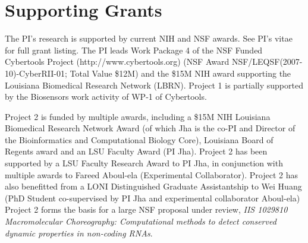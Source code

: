 \documentclass[a4paper,10pt]{article}
\begin{document}


\section*{Supporting Grants}

The PI's research is supported by current NIH and NSF awards.  See PI's vitae for full grant listing.
The PI leads Work Package 4 of the NSF Funded Cybertools Project (http://www.cybertools.org) (NSF Award NSF/LEQSF(2007-10)-CyberRII-01; Total Value \$12M) and the \$15M NIH award supporting the Louisiana Biomedical Research Network (LBRN). Project 1 is partially supported by the Biosensors work activity of WP-1 of Cybertools.

Project 2 is funded by multiple awards, including a \$15M NIH Louisiana Biomedical Research Network Award (of which Jha is the co-PI and Director of the Bioinformatics and Computational Biology Core), Louisiana Board of Regents award and an LSU Faculty Award (PI Jha). Project 2 has been supported by a LSU Faculty Research Award to PI Jha, in conjunction with multiple awards to Fareed Aboul-ela (Experimental Collaborator). Project 2 has also benefitted from a LONI Distinguished Graduate Assistantship to Wei Huang (PhD Student co-supervised by PI Jha and experimental collaborator Aboul-ela) Project 2 forms the basis for a large NSF proposal under review, {\it IIS 1029810 Macromolecular Choreography: Computational methods to detect conserved dynamic properties in non-coding RNAs}.
\end{document}
